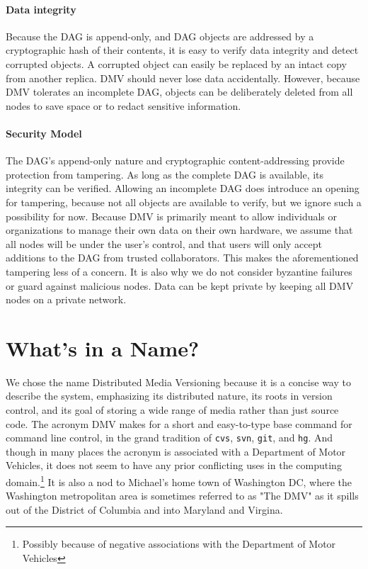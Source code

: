 \paragraph{Data integrity}

Because the DAG is append-only, and DAG objects are addressed by a cryptographic
hash of their contents, it is easy to verify data integrity and detect corrupted
objects. A corrupted object can easily be replaced by an intact copy from
another replica. DMV should never lose data accidentally. However, because DMV
tolerates an incomplete DAG, objects can be deliberately deleted from all nodes
to save space or to redact sensitive information.


\paragraph{Security Model}

The DAG's append-only nature and cryptographic content-addressing provide
protection from tampering. As long as the complete DAG is available, its
integrity can be verified. Allowing an incomplete DAG does introduce an opening
for tampering, because not all objects are available to verify, but we ignore
such a possibility for now. Because DMV is primarily meant to allow individuals
or organizations to manage their own data on their own hardware, we assume that
all nodes will be under the user's control, and that users will only accept
additions to the DAG from trusted collaborators. This makes the aforementioned
tampering less of a concern. It is also why we do not consider byzantine
failures or guard against malicious nodes. Data can be kept private by keeping
all DMV nodes on a private network.

%


\section{What's in a Name?}

We chose the name Distributed Media Versioning because it is a concise way to
describe the system, emphasizing its distributed nature, its roots in version
control, and its goal of storing a wide range of media rather than just source
code. The acronym DMV makes for a short and easy-to-type base command for
command line control, in the grand tradition of \lstinline{cvs},
\lstinline{svn}, \lstinline{git}, and \lstinline{hg}. And though in many places
the acronym is associated with a Department of Motor Vehicles, it does not seem
to have any prior conflicting uses in the computing domain.\footnote{Possibly
because of negative associations with the Department of Motor Vehicles} It is
also a nod to Michael's home town of Washington DC, where the Washington
metropolitan area is sometimes referred to as "The DMV" as it spills out of the
District of Columbia and into Maryland and Virgina.
